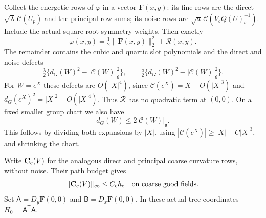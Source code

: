 \documentclass[11pt,reqno]{amsart}
\numberwithin{equation}{section}
\theoremstyle{definition}
\theoremstyle{remark}
\newcommand{\g}{\mathfrak g}
\begin{document}
Collect the energetic rows of \(\varphi\) in a vector
\(\mathbf F(x,y)\): its fine rows are the direct
\(\sqrt\lambda\,\mathcal C(U_p)\) and the principal row sums;
its noise rows are
\(\sqrt a\,\mathcal C(V_bQ(U)_b^{-1})\).
Include the actual square-root symmetry weights. Then exactly
\begin{equation}
          \varphi(x,y)=\tfrac12\|\mathbf F(x,y)\|_2^2
                                      +\mathcal R(x,y).
 \label{eq:calibrated-square-decomposition}
\end{equation}
The remainder contains the cubic and quartic slot polynomials
and the direct and noise defects
\[
 \tfrac\lambda2\{d_G(W)^2-|\mathcal C(W)|_{\g}^2\},
 \qquad
 \tfrac a2\{d_G(W)^2-|\mathcal C(W)|_{\g}^2\}.
\]
For \(W=e^X\) these defects are \(O(|X|^4)\), since
\(\mathcal C(e^X)=X+O(|X|^3)\) and
\(d_G(e^X)^2=|X|^2+O(|X|^4)\).
Thus \(\mathcal R\) has no quadratic term at \((0,0)\).
On a fixed smaller group chart we also have
\begin{equation}
                        d_G(W)\le2|\mathcal C(W)|_{\g}.
 \label{eq:calibrated-curvature-chord}
\end{equation}
This follows by dividing both expansions by \(|X|\), using
\(|\mathcal C(e^X)|\ge |X|-C|X|^3\), and shrinking the chart.

Write \(\mathbf C_{\rm c}(V)\) for the analogous direct and
principal coarse curvature rows, without noise. Their path budget
gives
\begin{equation}
 \|\mathbf C_{\rm c}(V)\|_\infty\le C_{\rm c}h_{\rm c}
             \quad\text{on coarse good fields}.
 \label{eq:calibrated-coarse-row-price}
\end{equation}
Set \(\mathsf A=D_y\mathbf F(0,0)\) and
\(\mathsf B=D_x\mathbf F(0,0)\). In these actual tree
coordinates \(H_0=\mathsf A^{\mathsf T}\mathsf A\).
\end{document}

